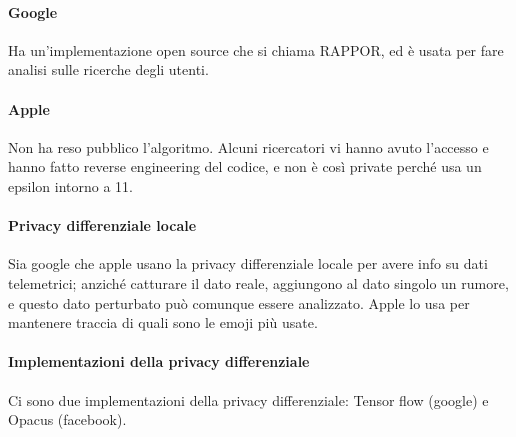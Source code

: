 \paragraph{Google} Ha un’implementazione open source che si chiama RAPPOR, ed è usata per fare analisi sulle ricerche degli utenti.
\paragraph{Apple} Non ha reso pubblico l’algoritmo. Alcuni ricercatori vi hanno avuto l’accesso e hanno fatto reverse engineering del codice, e non è così private perché usa un epsilon
intorno a 11.
\paragraph{Privacy differenziale locale} Sia google che apple usano la privacy differenziale locale per avere info su dati telemetrici; anziché catturare il dato reale, aggiungono al dato singolo un rumore, e questo dato perturbato può comunque essere analizzato. Apple lo usa per mantenere traccia di quali sono le emoji più usate.
\paragraph{Implementazioni della privacy differenziale }Ci sono due implementazioni della privacy differenziale: Tensor flow (google) e Opacus (facebook).












